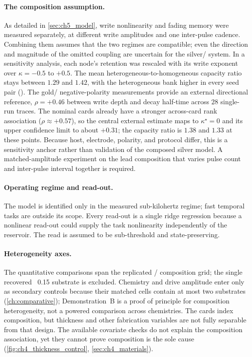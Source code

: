 \documentclass[12pt, twoside]{report}
\begin{document}
\paragraph{The composition assumption.} As detailed in \cref{sec:ch5_model}, write nonlinearity and fading memory were measured separately, at different write amplitudes and one inter-pulse cadence. Combining them assumes that the two regimes are compatible; even the direction and magnitude of the omitted coupling are uncertain for the silver/\PEO{} system. In a sensitivity analysis, each node's retention was rescaled with its write exponent over $\kappa=-0.5$ to $+0.5$. The mean heterogeneous-to-homogeneous capacity ratio stays between $1.29$ and $1.42$, with the heterogeneous bank higher in every seed pair (). The gold/\TMPE{} negative-polarity measurements provide an external directional reference, $\rho=+0.46$ between write depth and decay half-time across $28$ single-run traces. The nominal cards already have a stronger across-card rank association ($\rho\approx+0.57$), so the central external estimate maps to $\kappa^{\star}=0$ and its upper confidence limit to about $+0.31$; the capacity ratio is $1.38$ and $1.33$ at these points. Because host, electrode, polarity, and protocol differ, this is a sensitivity anchor rather than validation of the composed silver model. A matched-amplitude experiment on the lead composition that varies pulse count and inter-pulse interval together is required.

\paragraph{Operating regime and read-out.} The model is identified only in the measured sub-kilohertz regime; fast temporal tasks are outside its scope. Every read-out is a single ridge regression because a nonlinear read-out could supply the task nonlinearity independently of the reservoir. The read is assumed to be sub-threshold and state-preserving.

\paragraph{Heterogeneity axes.} The quantitative comparisons span the replicated \PEO{}/\LiTf{} composition grid; the single recovered \PEO{}~0.15 substrate is excluded. Chemistry and drive amplitude enter only as secondary controls because their matched cells contain at most two substrates (\cref{ch:comparative}); Demonstration~B is a proof of principle for composition heterogeneity, not a powered comparison across chemistries. The cards index composition, but thickness and other fabrication variables are not fully separable from that design. The available covariate checks do not explain the composition association, yet they cannot prove composition is the sole cause (\cref{fig:ch4_thickness_control}, \cref{sec:ch4_materials}).
\end{document}
